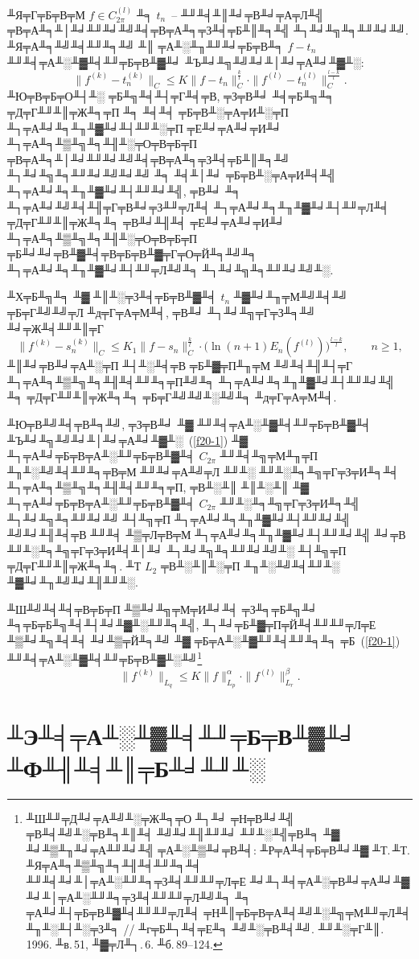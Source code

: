  ╨Я╤Г╤Б╤В╤М $f\in {C}^{(l)}_{{2\pi}}$ ╨╕ $t_n$~--
 ╨╜╨╡╨║╨╛╤В╨╛╤А╤Л╨╣ ╤В╤А╨╕╨│╨╛╨╜╨╛╨╝╨╡╤В╤А╨╕╤З╨╡╤Б╨║╨╕╨╣ ╨┐╨╛╨╗╨╕╨╜╨╛╨╝.
 ╨Я╤А╨╕╨╝╨╡╨╜╨╕╨╝ ╨║ ╤А╨░╨╖╨╜╨╛╤Б╤В╨╕ $f-t_n$ ╨╜╨╡╤А╨░╨▓╨╡╨╜╤Б╤В╨▓╨╛ ╨Ъ╨╛╨╗╨╝╨╛╨│╨╛╤А╨╛╨▓╨░:
 $$
 \|f^{(k)}-t_n^{(k)}\|_C\le K \|f-t_n\|_C^{\frac{k}{{l}}}\cdot
 \|f^{(l)}-t_n^{(l)}\|_C^{\frac{l-k}{l}}.
 $$
 ╨Ю╤В╤Б╤О╨┤╨░ ╤Б╨╗╨╡╨┤╤Г╨╡╤В, ╤З╤В╨╛ ╨╡╤Б╨╗╨╕ ╤Д╤Г╨╜╨║╤Ж╨╕╤П ╨╕  ╨╡╨╡ ╤Б╤В╨░╤А╤И╨░╤П ╨┐╤А╨╛╨╕╨╖╨▓╨╛╨┤╨╜╨░╤П
 ╤Е╨╛╤А╨╛╤И╨╛ ╨┐╤А╨╕╨▒╨╗╨╕╨╢╨░╤О╤В╤Б╤П ╤В╤А╨╕╨│╨╛╨╜╨╛╨╝╨╡╤В╤А╨╕╤З╨╡╤Б╨║╨╕╨╝ ╨┐╨╛╨╗╨╕╨╜╨╛╨╝╨╛╨╝ ╨╕ ╨╡╨│╨╛
 {╤Б╤В╨░╤А╤И╨╡╨╣} ╨┐╤А╨╛╨╕╨╖╨▓╨╛╨┤╨╜╨╛╨╣, ╤В╨╛ ╨╕ ╨┐╤А╨╛╨╝╨╡╨╢╤Г╤В╨╛╤З╨╜╤Л╨╡ ╨┐╤А╨╛╨╕╨╖╨▓╨╛╨┤╨╜╤Л╨╡
 ╤Д╤Г╨╜╨║╤Ж╨╕╨╕ ╤В╨╛╨╢╨╡ ╤Е╨╛╤А╨╛╤И╨╛ ╨┐╤А╨╕╨▒╨╗╨╕╨╢╨░╤О╤В╤Б╤П
 {╤Б╨╛╨╛╤В╨▓╨╡╤В╤Б╤В╨▓╤Г╤О╤Й╨╕╨╝╨╕} {╨┐╤А╨╛╨╕╨╖╨▓╨╛╨┤╨╜╤Л╨╝╨╕ ╨┐╨╛╨╗╨╕╨╜╨╛╨╝╨░}.

 ╨Х╤Б╨╗╨╕ ╨▓ ╨║╨░╤З╨╡╤Б╤В╨▓╨╡ $t_n$ ╨▓╨╛╨╖╤М╨╝╨╡╨╝ ╤Б╤Г╨╝╨╝╤Л ╨д╤Г╤А╤М╨╡, ╤В╨╛ ╨┐╨╛╨╗╤Г╤З╨╕╨╝ ╨╛╤Ж╨╡╨╜╨║╤Г
 $$
   \|f^{(k)}-s_n^{(k)}\|_C\le K_{{1}} \|f-s_n \|_C^{\frac{k}{l}}\cdot
   \Big(\ln (n+1)  {E_n(f^{(l)})\Big)^{\frac{l-k}{l}},\qquad n\ge 1},
 $$
 ╨║╨╛╤В╨╛╤А╨░╤П ╨┤╨░╨╡╤В ╤Б╨▓╤П╨╖╤М ╨╝╨╡╨╢╨┤╤Г ╨┐╤А╨╕╨▒╨╗╨╕╨╢╨╡╨╜╨╕╤П╨╝╨╕ ╨┐╤А╨╛╨╕╨╖╨▓╨╛╨┤╨╜╨╛╨╣ ╨╕ ╤Д╤Г╨╜╨║╤Ж╨╕╨╕
 ╤Б╤Г╨╝╨╝╨░╨╝╨╕ ╨д╤Г╤А╤М╨╡.

 ╨Ю╤В╨╝╨╡╤В╨╕╨╝, ╤З╤В╨╛ ╨▓ ╨╜╨╡╤А╨░╨▓╨╡╨╜╤Б╤В╨▓╨╡ ╨Ъ╨╛╨╗╨╝╨╛╨│╨╛╤А╨╛╨▓╨░~(\ref{f20-1}) ╨▓ ╨┐╤А╨╛╤Б╤В╤А╨░╨╜╤Б╤В╨▓╨╡ $C_{2\pi}$
 ╨╜╨╡╨╗╤М╨╖╤П ╨╖╨░╨╝╨╡╨╜╨╕╤В╤М ╨╜╨╛╤А╨╝╤Л ╨╜╨░ ╨╜╨░╨╕╨╗╤Г╤З╤И╨╕╨╡ ╨┐╤А╨╕╨▒╨╗╨╕╨╢╨╡╨╜╨╕╤П, ╤В╨░╨║ ╨║╨░╨║ ╨▓
 ╨┐╤А╨╛╤Б╤В╤А╨░╨╜╤Б╤В╨▓╨╡ $C_{2\pi}$ ╨╜╨░╨╕╨╗╤Г╤З╤И╨╕╨╣ ╨┐╨╛╨╗╨╕╨╜╨╛╨╝ ╨┤╨╗╤П ╨┐╤А╨╛╨╕╨╖╨▓╨╛╨┤╨╜╨╛╨╣ ╨╝╨╛╨╢╨╡╤В ╨╜╨╡ ╨▒╤Л╤В╤М
 ╨┐╤А╨╛╨╕╨╖╨▓╨╛╨┤╨╜╨╛╨╣ ╨╛╤В ╨╜╨░╨╕╨╗╤Г╤З╤И╨╡╨│╨╛ ╨┐╨╛╨╗╨╕╨╜╨╛╨╝╨░ ╨┤╨╗╤П ╤Д╤Г╨╜╨║╤Ж╨╕╨╕. ╨Т $L_2$ ╤В╨░╨║╨░╤П ╨╖╨░╨╝╨╡╨╜╨░ ╨▓╨╛╨╖╨╝╨╛╨╢╨╜╨░.

╨Ш╨╝╨╡╨╡╤В╤Б╤П ╨▒╨╛╨╗╤М╤И╨╛╨╡ ╤З╨╕╤Б╨╗╨╛ ╨╕╤Б╤Б╨╗╨╡╨┤╨╛╨▓╨░╨╜╨╕╨╣, ╨┐╨╛╤Б╨▓╤П╤Й╨╡╨╜╨╜╤Л╤Е ╨▒╨╛╨╗╨╡╨╡ ╨╛╨▒╤Й╨╕╨╝
 ╨▓ ╤Б╤А╨░╨▓╨╜╨╡╨╜╨╕╨╕ ╤Б~(\ref{f20-1}) ╨╜╨╡╤А╨░╨▓╨╡╨╜╤Б╤В╨▓╨░╨╝\footnote{╨Ш╨╜╤Д╨╛╤А╨╝╨░╤Ж╨╕╤О ╨┐╨╛
 ╤Н╤В╨╛╨╣ ╤В╨╡╨╝╨░╤В╨╕╨║╨╡ ╨╝╨╛╨╢╨╜╨╛ ╨╜╨░╨╣╤В╨╕ ╨▓ ╨╛╨▒╨╖╨╛╤А╨╜╨╛╨╣ ╤А╨░╨▒╨╛╤В╨╡:
╨Р╤А╨╡╤Б╤В╨╛╨▓ ╨Т.\,╨Т. ╨Я╤А╨╕╨▒╨╗╨╕╨╢╨╡╨╜╨╕╨╡ ╨╜╨╡╨╛╨│╤А╨░╨╜╨╕╤З╨╡╨╜╨╜╤Л╤Е ╨╛╨┐╨╡╤А╨░╤В╨╛╤А╨╛╨▓ ╨╛╨│╤А╨░╨╜╨╕╤З╨╡╨╜╨╜╤Л╨╝╨╕ ╨╕
╤А╨╛╨┤╤Б╤В╨▓╨╡╨╜╨╜╤Л╨╡ ╤Н╨║╤Б╤В╤А╨╡╨╝╨░╨╗╤М╨╜╤Л╨╡ ╨╖╨░╨┤╨░╤З╨╕
 // ╨г╤Б╨┐╨╡╤Е╨╕ ╨╝╨░╤В╨╡╨╝. ╨╜╨░╤Г╨║. 1996. ╨в.\,51, ╨▓╤Л╨┐.\,6. ╨б.\,89--124.}
 $$
 \|f^{(k)}\|_{L_q}\le K\|f\|_{L_p}^{\alpha}\cdot
 \|f^{(l)}\|_{L_r}^{\beta}.
 $$


 \section{╨Э╨╡╤А╨░╨▓╨╡╨╜╤Б╤В╨▓╨╛ ╨Ф╨╢╨╡╨║╤Б╨╛╨╜╨░}

